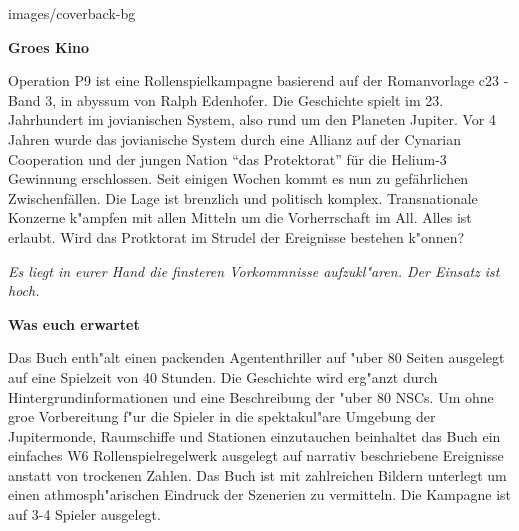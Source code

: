 \begin{backcover}{images/coverback-bg}
    
    \vspace{5mm}
    \textbf{Gro\3es Kino}

    Operation P9 ist eine Rollenspielkampagne basierend auf der Romanvorlage c23 - Band 3, in abyssum von Ralph Edenhofer. Die Geschichte spielt im 23. Jahrhundert im jovianischen System, also rund um den Planeten Jupiter. Vor 4 Jahren wurde das jovianische System durch eine Allianz auf der Cynarian Cooperation und der jungen Nation "`das Protektorat"' für die Helium-3 Gewinnung erschlossen. Seit einigen Wochen kommt es nun zu gefährlichen Zwischenfällen. Die Lage ist brenzlich und politisch komplex. Transnationale Konzerne k"ampfen mit allen Mitteln um die Vorherrschaft im All. Alles ist erlaubt. Wird das Protktorat im Strudel der Ereignisse bestehen k"onnen?
    
    \medskip
    \emph{Es liegt in eurer Hand die finsteren Vorkommnisse aufzukl"aren. Der Einsatz ist hoch.}

    \vspace{5mm}
    \textbf{Was euch erwartet}

    Das Buch enth"alt einen packenden Agententhriller auf "uber 80 Seiten ausgelegt auf eine Spielzeit von 40 Stunden. Die Geschichte wird erg"anzt durch Hintergrundinformationen und eine Beschreibung der "uber 80 NSCs. Um ohne gro\3e Vorbereitung f"ur die Spieler in die spektakul"are Umgebung der Jupitermonde, Raumschiffe und Stationen einzutauchen beinhaltet das Buch ein einfaches W6 Rollenspielregelwerk ausgelegt auf narrativ beschriebene Ereignisse anstatt von trockenen Zahlen. Das Buch ist mit zahlreichen Bildern unterlegt um einen athmosph"arischen Eindruck der Szenerien zu vermitteln. Die Kampagne ist auf 3-4 Spieler ausgelegt.
\end{backcover}
